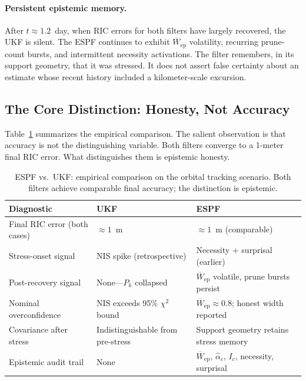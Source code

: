 \documentclass[12pt]{article}
\begin{document}
\paragraph{Persistent epistemic memory.}
After $t\approx 1.2$~day, when RIC errors for both filters have largely
recovered, the UKF is silent.
The ESPF continues to exhibit $\overline{W}_\mathrm{ep}$ volatility,
recurring prune-count bursts, and intermittent necessity activations.
The filter remembers, in its support geometry, that it was stressed.
It does not assert false certainty about an estimate whose recent history
included a kilometer-scale excursion.

\subsection{The Core Distinction: Honesty, Not Accuracy}

Table~\ref{tab:comparison} summarizes the empirical comparison.
The salient observation is that accuracy is not the distinguishing variable.
Both filters converge to a 1-meter final RIC error.
What distinguishes them is epistemic honesty.

\begin{table}[h]
\centering
\caption{ESPF vs.\ UKF: empirical comparison on the orbital tracking scenario.
Both filters achieve comparable final accuracy; the distinction is epistemic.}
\label{tab:comparison}
\renewcommand{\arraystretch}{1.25}
\small
\begin{tabular}{@{}lp{3.8cm}p{4.2cm}@{}}
\toprule
\textbf{Diagnostic} & \textbf{UKF} & \textbf{ESPF} \\
\midrule
Final RIC error (both cases) & $\approx 1$~m & $\approx 1$~m (comparable) \\
Stress-onset signal & NIS spike (retrospective) & Necessity + surprisal (earlier) \\
Post-recovery signal & None---$P_k$ collapsed & $\overline{W}_\mathrm{ep}$ volatile, prune bursts persist \\
Nominal overconfidence & NIS exceeds 95\% $\chi^2$ bound & $\overline{W}_\mathrm{ep}\approx 0.8$; honest width reported \\
Covariance after stress & Indistinguishable from pre-stress & Support geometry retains stress memory \\
Epistemic audit trail & None & $\overline{W}_\mathrm{ep}$, $\hat\alpha_c$, $I_c$, necessity, surprisal \\
\bottomrule
\end{tabular}
\end{table}
\end{document}

